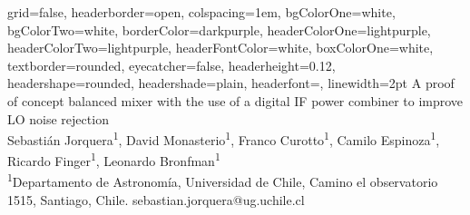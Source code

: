 \documentclass[a0paper,portrait]{baposter}
\begin{document}

\begin{poster}
{
grid=false,
headerborder=open, %
colspacing=1em, %
bgColorOne=white, %
bgColorTwo=white, %
borderColor=darkpurple, %
headerColorOne=lightpurple, %
headerColorTwo=lightpurple, %
headerFontColor=white, %
boxColorOne=white, %
textborder=rounded, %
eyecatcher=false, %
headerheight=0.12\textheight, %
headershape=rounded, %
headershade=plain,
headerfont=\Large\textsf, %
linewidth=2pt %
}
{}
%
%
{
\textsf %
{
A proof of concept balanced mixer with the use of a digital IF power combiner to improve LO noise rejection
}
} %
{\sf\vspace{0.1em}\\
Sebastián Jorquera\textsuperscript{1}, David Monasterio\textsuperscript{1}, Franco Curotto\textsuperscript{1}, Camilo Espinoza\textsuperscript{1},
Ricardo Finger\textsuperscript{1}, Leonardo Bronfman\textsuperscript{1}
\vspace{0.1em}\\
\small{\textsuperscript{1}Departamento de Astronomía, Universidad de Chile, Camino el observatorio 1515, Santiago, Chile.
sebastian.jorquera@ug.uchile.cl}
}
\end{poster}
\end{document}
